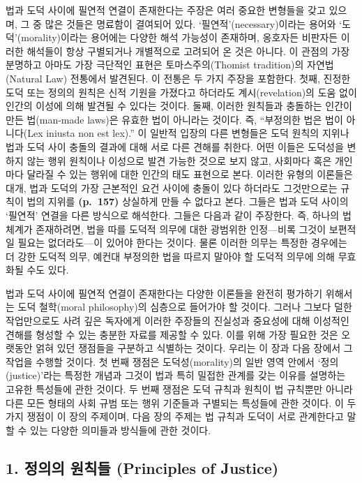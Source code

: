 법과 도덕 사이에 필연적 연결이 존재한다는 주장은 여러 중요한 변형들을
갖고 있으며, 그 중 많은 것들은 명료함이 결여되어 있다.
`필연적'(necessary)이라는 용어와 `도덕'(morality)이라는 용어에는 다양한
해석 가능성이 존재하며, 옹호자든 비판자든 이러한 해석들이 항상
구별되거나 개별적으로 고려되어 온 것은 아니다. 이 관점의 가장 분명하고
아마도 가장 극단적인 표현은 토마스주의(Thomist tradition)의
자연법(Natural Law) 전통에서 발견된다. 이 전통은 두 가지 주장을
포함한다. 첫째, 진정한 도덕 또는 정의의 원칙은 신적 기원을 가졌다고
하더라도 계시(revelation)의 도움 없이 인간의 이성에 의해 발견될 수
있다는 것이다. 둘째, 이러한 원칙들과 충돌하는 인간이 만든 법(man-made
laws)은 유효한 법이 아니라는 것이다. 즉, ``부정의한 법은 법이 아니다(Lex
iniusta non est lex).'' 이 일반적 입장의 다른 변형들은 도덕 원칙의
지위나 법과 도덕 사이 충돌의 결과에 대해 서로 다른 견해를 취한다. 어떤
이들은 도덕성을 변하지 않는 행위 원칙이나 이성으로 발견 가능한 것으로
보지 않고, 사회마다 혹은 개인마다 달라질 수 있는 행위에 대한 인간의 태도
표현으로 본다. 이러한 유형의 이론들은 대개, 법과 도덕의 가장 근본적인
요건 사이에 충돌이 있다 하더라도 그것만으로는 규칙이 법의 지위를
\textbf{(p.~157)} 상실하게 만들 수 없다고 본다. 그들은 법과 도덕 사이의
`필연적' 연결을 다른 방식으로 해석한다. 그들은 다음과 같이 주장한다. 즉,
하나의 법체계가 존재하려면, 법을 따를 도덕적 의무에 대한 광범위한
인정---비록 그것이 보편적일 필요는 없더라도---이 있어야 한다는 것이다.
물론 이러한 의무는 특정한 경우에는 더 강한 도덕적 의무, 예컨대 부정의한
법을 따르지 말아야 할 도덕적 의무에 의해 무효화될 수도 있다.

법과 도덕 사이에 필연적 연결이 존재한다는 다양한 이론들을 완전히
평가하기 위해서는 도덕 철학(moral philosophy)의 심층으로 들어가야 할
것이다. 그러나 그보다 덜한 작업만으로도 사려 깊은 독자에게 이러한
주장들의 진실성과 중요성에 대해 이성적인 견해를 형성할 수 있는 충분한
자료를 제공할 수 있다. 이를 위해 가장 필요한 것은 오랫동안 얽혀 있던
쟁점들을 구분하고 식별하는 것이다. 우리는 이 장과 다음 장에서 그 작업을
수행할 것이다. 첫 번째 쟁점은 도덕성(morality)의 일반 영역 안에서
`정의(justice)'라는 특정한 개념과 그것이 법과 특히 밀접한 관계를 갖는
이유를 설명하는 고유한 특성들에 관한 것이다. 두 번째 쟁점은 도덕 규칙과
원칙이 법 규칙뿐만 아니라 다른 모든 형태의 사회 규범 또는 행위 기준들과
구별되는 특성들에 관한 것이다. 이 두 가지 쟁점이 이 장의 주제이며, 다음
장의 주제는 법 규칙과 도덕이 서로 관계한다고 말할 수 있는 다양한
의미들과 방식들에 관한 것이다.

\subsection{1. 정의의 원칙들 (Principles of
Justice)}\label{uxc815uxc758uxc758-uxc6d0uxce59uxb4e4-principles-of-justice}

